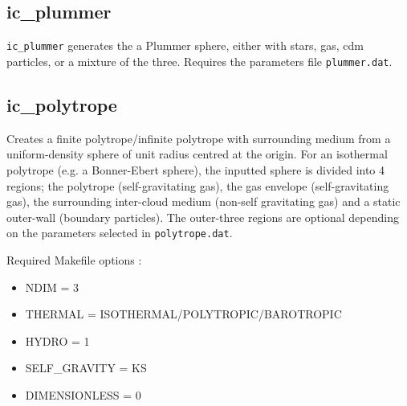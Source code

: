 \documentclass[a4paper]{article}
\newcommand{\var}[1]{\texttt{#1}}
\begin{document}
\subsection{ic\_plummer}
\var{ic\_plummer} generates the a Plummer sphere, either with stars, gas, cdm particles, or a mixture of the three.  Requires the parameters file \var{plummer.dat}.

\newpage



\subsection{ic\_polytrope}
Creates a finite polytrope/infinite polytrope with surrounding medium from a uniform-density sphere of unit radius centred at the origin.  For an isothermal polytrope (e.g. a Bonner-Ebert sphere), the inputted sphere is divided into 4 regions; the polytrope (self-gravitating gas), the gas envelope (self-gravitating gas), the surrounding inter-cloud medium (non-self gravitating gas) and a static outer-wall (boundary particles).  The outer-three regions are optional depending on the parameters selected in \var{polytrope.dat}. \newline

\noindent Required Makefile options :
\begin{itemize}
\item NDIM = 3
\item THERMAL = ISOTHERMAL/POLYTROPIC/BAROTROPIC
\item HYDRO = 1
\item SELF\_GRAVITY = KS
\item DIMENSIONLESS = 0
\end{itemize}

\vspace{0.1cm}
\end{document}
